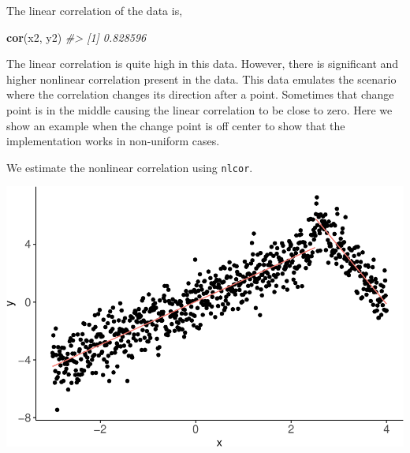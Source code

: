 \documentclass[]{article}
\newenvironment{Shaded}{\begin{snugshade}}{\end{snugshade}}
\newcommand{\CommentTok}[1]{\textcolor[rgb]{0.56,0.35,0.01}{\textit{#1}}}
\newcommand{\DataTypeTok}[1]{\textcolor[rgb]{0.13,0.29,0.53}{#1}}
\newcommand{\KeywordTok}[1]{\textcolor[rgb]{0.13,0.29,0.53}{\textbf{#1}}}
\newcommand{\NormalTok}[1]{#1}
\newcommand{\OperatorTok}[1]{\textcolor[rgb]{0.81,0.36,0.00}{\textbf{#1}}}
\newcommand{\StringTok}[1]{\textcolor[rgb]{0.31,0.60,0.02}{#1}}
\begin{document}
The linear correlation of the data is,

\begin{Shaded}
\begin{Highlighting}[]
\KeywordTok{cor}\NormalTok{(x2, y2)}
\CommentTok{#> [1] 0.828596}
\end{Highlighting}
\end{Shaded}

The linear correlation is quite high in this data. However, there is
significant and higher nonlinear correlation present in the data. This
data emulates the scenario where the correlation changes its direction
after a point. Sometimes that change point is in the middle causing the
linear correlation to be close to zero. Here we show an example when the
change point is off center to show that the implementation works in
non-uniform cases.

We estimate the nonlinear correlation using \texttt{nlcor}.

\begin{Shaded}
\end{Shaded}

\begin{center}\includegraphics{README_files/figure-latex/Figure-2.2-1} \end{center}
\end{document}
